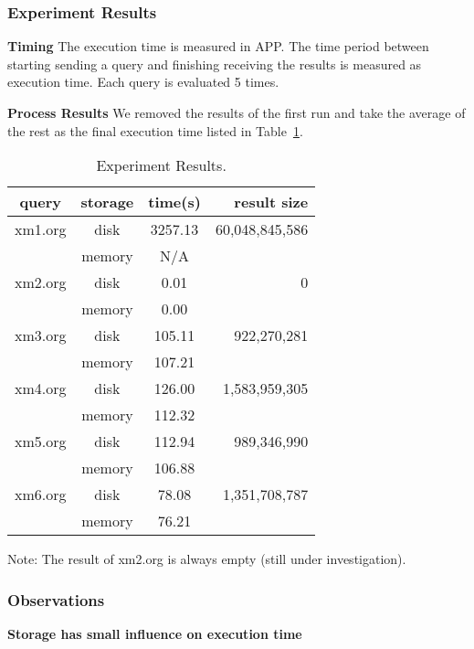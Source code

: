 \subsubsection{Experiment Results}

\textbf{Timing} The execution time is measured in APP. The time period between
starting sending a query and finishing receiving the results is measured as
execution time. Each query is evaluated 5 times. 

\textbf{Process Results}
We removed the results of the  first run and take the average of the rest as
the final execution time listed in Table~\ref{table:E2017120401_1}. 


\begin{table}[t]
	\caption{Experiment Results.}
	\label{table:E2017120401_1}
	\centering
	\begin{tabular}{c|c|c|r}
 		\hline \hline
 query  & storage & time(s)  &   result size  \\
 \hline \hline
 xm1.org &  disk   & 3257.13  & 60,048,845,586 \\
         & memory  &    N/A   &  \\
 \hline
 xm2.org &  disk   &    0.01  &              0 \\
         & memory  &    0.00  &  \\
  \hline
 xm3.org &  disk   &  105.11  &    922,270,281 \\
         & memory  &  107.21  &  \\
  \hline
 xm4.org &  disk   &  126.00  &  1,583,959,305 \\
         & memory  &  112.32  &  \\
  \hline
 xm5.org &  disk   &  112.94  &    989,346,990 \\
         & memory  &  106.88  &   \\
  \hline
 xm6.org &  disk   &   78.08  &  1,351,708,787 \\
         & memory  &   76.21  &   \\
 \hline \hline
	\end{tabular}
\end{table}


Note: The result of xm2.org is always empty (still under investigation).


\subsubsection{Observations}
\textbf{Storage has small influence on execution time}

